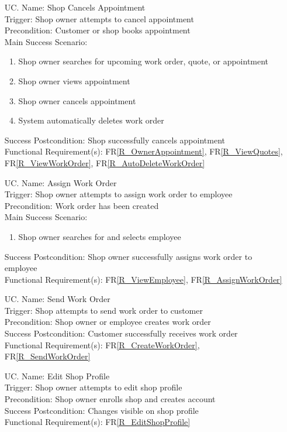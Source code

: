 \documentclass[12pt]{article}
\newcounter{ucnum} %
\begin{document}
\begin{itemize}
\item[UC\refstepcounter{ucnum}\theucnum \label{UC_CancelAppointment}. ]
Name: Shop Cancels Appointment\\
Trigger: Shop owner attempts to cancel appointment\\
Precondition: Customer or shop books appointment\\
Main Success Scenario:
\begin{enumerate}
    \item Shop owner searches for upcoming work order, quote, or appointment
    \item Shop owner views appointment
    \item Shop owner cancels appointment
    \item System automatically deletes work order
\end{enumerate}
Success Postcondition: Shop successfully cancels appointment\\
Functional Requirement(s): FR\ref{R_OwnerAppointment}, FR\ref{R_ViewQuotes}, FR\ref{R_ViewWorkOrder}, FR\ref{R_AutoDeleteWorkOrder}

\item[UC\refstepcounter{ucnum}\theucnum \label{UC_AssignWorkOrder}. ]
Name: Assign Work Order\\
Trigger: Shop owner attempts to assign work order to employee\\
Precondition: Work order has been created\\
Main Success Scenario:
\begin{enumerate}
    \item Shop owner searches for and selects employee
\end{enumerate}
Success Postcondition: Shop owner successfully assigns work order to employee\\
Functional Requirement(s): FR\ref{R_ViewEmployee}, FR\ref{R_AssignWorkOrder}

\item[UC\refstepcounter{ucnum}\theucnum \label{UC_SendWorkOrder}. ]
Name: Send Work Order\\
Trigger: Shop attempts to send work order to customer\\
Precondition: Shop owner or employee creates work order\\
Success Postcondition: Customer successfully receives work order\\
Functional Requirement(s): FR\ref{R_CreateWorkOrder}, FR\ref{R_SendWorkOrder}

\item[UC\refstepcounter{ucnum}\theucnum \label{UC_EditShopProfile}. ]
Name: Edit Shop Profile\\
Trigger: Shop owner attempts to edit shop profile\\
Precondition: Shop owner enrolls shop and creates account\\
Success Postcondition: Changes visible on shop profile\\
Functional Requirement(s): FR\ref{R_EditShopProfile}


\end{itemize}
\end{document}
